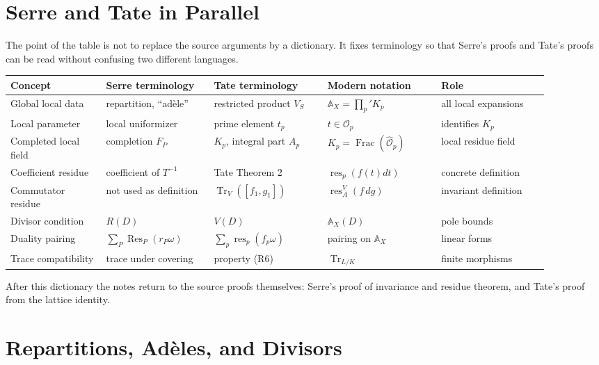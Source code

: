 \documentclass[11pt,a4paper]{article}
\newcommand{\OO}{\mathcal O}
\newcommand{\wideO}{\widehat{\mathcal O}}
\newcommand{\AX}{\mathbb A_X}
\newcommand{\Frac}{\operatorname{Frac}}
\newcommand{\res}{\operatorname{res}}
\newcommand{\Tr}{\operatorname{Tr}}
\theoremstyle{definition}
\theoremstyle{plain}
\theoremstyle{remark}
\begin{document}
\section{Serre and Tate in Parallel}

The point of the table is not to replace the source arguments by a dictionary.  It fixes terminology so that Serre's proofs and Tate's proofs can be read without confusing two different languages.

\begin{center}
\tiny
\setlength{\tabcolsep}{2pt}
\begin{tabular}{L{0.16\linewidth}L{0.18\linewidth}L{0.19\linewidth}L{0.19\linewidth}L{0.18\linewidth}}
\toprule
Concept & Serre terminology & Tate terminology & Modern notation & Role \\
\midrule
Global local data & repartition, ``adèle'' & restricted product $V_S$ & $\AX=\prod_p'K_p$ & all local expansions \\
Local parameter & local uniformizer & prime element $t_p$ & $t\in\OO_p$ & identifies $K_p$ \\
Completed local field & completion $F_P$ & $K_p$, integral part $A_p$ & $K_p=\Frac(\wideO_p)$ & local residue field \\
Coefficient residue & coefficient of $T^{-1}$ & Tate Theorem 2 & $\res_p(f(t)dt)$ & concrete definition \\
Commutator residue & not used as definition & $\Tr_V([f_1,g_1])$ & $\res_A^V(f\,dg)$ & invariant definition \\
Divisor condition & $R(D)$ & $V(D)$ & $\AX(D)$ & pole bounds \\
Duality pairing & $\sum_P\operatorname{Res}_P(r_P\omega)$ & $\sum_p\res_p(f_p\omega)$ & pairing on $\AX$ & linear forms \\
Trace compatibility & trace under covering & property (R6) & $\Tr_{L/K}$ & finite morphisms \\
\bottomrule
\end{tabular}
\end{center}

After this dictionary the notes return to the source proofs themselves: Serre's proof of invariance and residue theorem, and Tate's proof from the lattice identity.

\section{Repartitions, Adèles, and Divisors}
\end{document}
